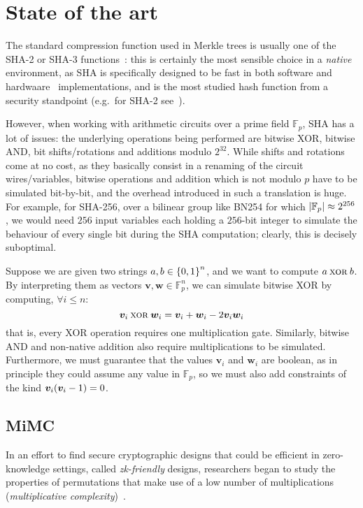 \section{State of the art}\label{sec:sota}
The standard compression function used in Merkle trees is usually one of the SHA-2 or SHA-3 
functions~\cite{Dang2015}: this is certainly the most sensible choice in a \emph{native} 
environment, as SHA is specifically designed to be fast in both software and 
hardwaare~\cite{DaddaMO2004,MichailAKTG2012} implementations, and is the most studied hash function 
from a security standpoint (e.g.\ for SHA-2 see~\cite{KhovratovichRS2012,GuoLRW2010,DobraunigEM2016}).

However, when working with arithmetic circuits over a prime field \(\mathbb{F}_p\), SHA has a lot 
of issues: the underlying operations being performed are bitwise XOR, bitwise AND, 
bit shifts/rotations and additions modulo \(2^{32}\).
While shifts and rotations come at no cost, as they basically consist in a renaming of the circuit 
wires/variables, bitwise operations and addition which is not modulo \(p\) have to be simulated 
bit-by-bit, and the overhead introduced in such a translation is huge.
For example, for SHA-256, over a bilinear group like BN254 for which 
\(\left\lvert\mathbb{F}_p\right\rvert \approx 2^{256}\), we would need \(256\) input variables each holding a
\(256\)-bit integer to simulate the behaviour of every single bit during the SHA computation; 
clearly, this is decisely suboptimal.

\begin{example}
  Suppose we are given two strings \(a, b \in \left\{0, 1\right\}^{n}\), and we want to compute 
  \(a \mathbin{\textnormal{\textsc{xor}}} b\).
  By interpreting them as vectors \(\bm{v}, \bm{w} \in \mathbb{F}_{p}^{n}\), we can simulate 
  bitwise XOR by computing, \(\forall i \le n\):
  \[\bm{v}_{i} \mathbin{\textnormal{\textsc{xor}}} \bm{w}_{i} = \bm{v}_{i} + \bm{w}_{i} - 2\bm{v}_{i}\bm{w}_{i}\]
  that is, every XOR operation requires one multiplication gate.
  Similarly, bitwise AND and non-native addition also require multiplications to be simulated.
  Furthermore, we must guarantee that the values \(\bm{v}_i\) and \(\bm{w}_i\) are boolean, as 
  in principle they could assume any value in \(\mathbb{F}_p\), so we must also add constraints of 
  the kind \(\bm{v}_{i}\Parens*{\bm{v}_i - 1} = 0\).
\end{example}

\subsection{MiMC}
In an effort to find secure cryptographic designs that could be efficient in zero-knowledge 
settings, called \emph{zk-friendly} designs, researchers began to study the properties of 
permutations that make use of a low number of multiplications 
(\emph{multiplicative complexity})~\cite{AlbrechtRSTZ2016}.

